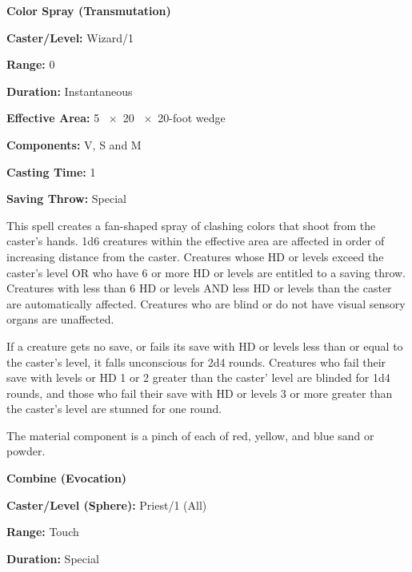 \begin{multicols}{2}
\vspace{1em}

\noindent
\begin{minipage}{\columnwidth}

\noindent \textbf{Color Spray (Transmutation)}

\noindent \textbf{Caster/Level:} Wizard/1

\noindent \textbf{Range:} 0

\noindent \textbf{Duration:} Instantaneous

\noindent \textbf{Effective Area:} 5 ~$\times$~20 ~$\times$~20-foot wedge

\noindent \textbf{Components:} V, S and M

\noindent \textbf{Casting Time:} 1

\noindent \textbf{Saving Throw:} Special

\end{minipage}

This spell creates a fan-shaped spray of clashing colors that shoot from the caster's hands.  1d6 creatures within the effective area are affected in order of increasing distance from the caster.  Creatures whose HD or levels exceed the caster's level OR who have 6 or more HD or levels are entitled to a saving throw.  Creatures with less than 6 HD or levels AND less HD or levels than the caster are automatically affected.  Creatures who are blind or do not have visual sensory organs are unaffected.

If a creature gets no save, or fails its save with HD or levels less than or equal to the caster's level, it falls unconscious for 2d4 rounds.  Creatures who fail their save with levels or HD 1 or 2 greater than the caster' level are blinded for 1d4 rounds, and those who fail their save with HD or levels 3 or more greater than the caster's level are stunned for one round.

The material component is a pinch of each of red, yellow, and blue sand or powder.

\vspace{1em}

\noindent
\begin{minipage}{\columnwidth}

\noindent \textbf{Combine (Evocation)}

\noindent \textbf{Caster/Level (Sphere):} Priest/1 (All)

\noindent \textbf{Range:} Touch

\noindent \textbf{Duration:} Special


\end{minipage}
\end{multicols}
